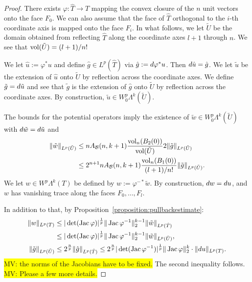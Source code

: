 \documentclass[10pt,a4paper]{article}
\newcommand{\todo}[1]{{\colorbox{yellow}{#1}}}
\begin{document}
\begin{proof}
    There exists $\varphi : \hat T \rightarrow T$ mapping the convex closure of the $n$ unit vectors onto the face $F_0$.
    We can also assume that the face of $\hat T$
    orthogonal to the $i$-th coordinate axis is mapped 
    onto the face $F_i$. 
    In what follows, we let $\tilde U$ be the domain obtained from reflecting $\hat T$ along the coordinate axes $l+1$ through $n$. 
    We see that $\operatorname{vol}(\tilde U) = (l+1)/n!$
    
    We let $\hat u := \varphi^{\ast} u$ and define $\hat g \in L^{p}(\hat T)$ via $\hat g := d \varphi^{\ast} u$. 
    Then $d \hat u = \hat g$. 
    We let $\tilde u$ be the extension of $\hat u$ onto $\tilde U$ by reflection across the coordinate axes.
    We define $\tilde g = d \tilde u$
    and see that $\tilde g$ is the extension of $\hat g$ onto $\tilde U$ by reflection across the coordinate axes. 
    By construction, $\tilde u \in W^{p}_{0}\Lambda^{k}(\tilde U)$.
    
    The bounds for the potential operators imply 
    the existence of $\tilde w \in W^{p}_{0}\Lambda^{k}(\tilde U)$
    with $d \tilde w = d \tilde u$ and 
    \begin{align*}
        \| \tilde w \|_{L^{p}(\tilde U)}
        &\leq 
        n A_{{\mathcal B}}(n,k+1) \frac{ \operatorname{vol}_{n}(B_2(0)) }{ \operatorname{vol}(\tilde U) } 
        2
        \| \tilde g \|_{L^{p}(\tilde U)}
        \\&\leq 
        2^{n+1} n A_{{\mathcal B}}(n,k+1) \frac{ \operatorname{vol}_{n}(B_1(0)) }{ (l+1)/n! } 
        \| \tilde g \|_{L^{p}(\tilde U)}
        .
    \end{align*}
    We let $w \in W^{p}\Lambda^{k}(T)$ be defined by $w := \varphi^{-\ast} \tilde w$.
    By construction, $d w = d u$,
    and $w$ has vanishing trace along the faces $F_{0},\dots,F_{l}$.
    
    In addition to that, by Proposition~\ref{proposition:pullbackestimate}:
    \begin{align*}
        \| w \|_{L^{p}(T)}
        &\leq 
        |\det(\operatorname{{\rm Jac}} \varphi)|^{\frac 1 p} 
        \|  \operatorname{{\rm Jac}} \varphi^{-1}  \|_{2}^{k-1}
        \| \tilde w \|_{L^{p}(\hat T)}
        \\&
        \leq 
        |\det(\operatorname{{\rm Jac}} \varphi)|^{\frac 1 p} 
        \|  \operatorname{{\rm Jac}} \varphi^{-1}  \|_{2}^{k-1}
        \| \tilde w \|_{L^{p}(\tilde U)}
        ,
        \\
        \| \tilde g \|_{L^{p}(\tilde U)}
        &\leq 
        2^{\frac n p}
        \| \hat g \|_{L^{p}(\hat T)}
        \leq 
        2^{\frac n p}
        |\det( \operatorname{{\rm Jac}} \varphi^{-1} )|^{\frac 1 p} 
        \| \operatorname{{\rm Jac}} \varphi \|_{2}^{k}
        \cdot 
        \| d u \|_{L^{p}(T)}
        .
    \end{align*}
    \todo{MV: the norms of the Jacobians have to be fixed.}
    The second inequality follows.
    \todo{MV: Please a few more details.}
\end{proof}
\end{document}

